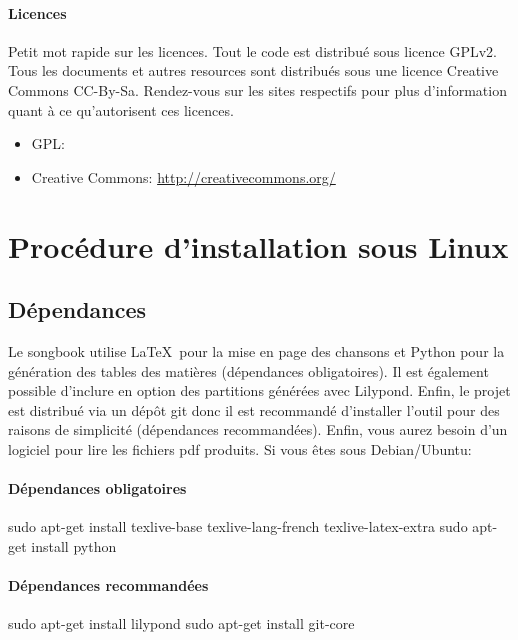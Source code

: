 \documentclass[versionenligne]{patacrep}
\begin{document}
\paragraph{Licences}
Petit mot rapide sur les licences. Tout le code est distribué sous
licence GPLv2. Tous les documents et autres resources sont distribués
sous une licence Creative Commons CC-By-Sa. Rendez-vous sur les sites
respectifs pour plus d'information quant à ce qu'autorisent ces
licences.
\begin{itemize}
\item GPL: \url{}
\item Creative Commons: \url{http://creativecommons.org/}
\end{itemize}


\section{Procédure d'installation sous Linux}

\subsection{Dépendances}
\label{sec:songbook-dep}

Le songbook utilise \LaTeX\, pour la mise en page des chansons et
Python pour la génération des tables des matières (dépendances
obligatoires).  Il est également possible d'inclure en option des
partitions générées avec Lilypond. Enfin, le projet est distribué via
un dépôt git donc il est recommandé d'installer l'outil pour des
raisons de simplicité (dépendances recommandées). Enfin, vous aurez
besoin d'un logiciel pour lire les fichiers pdf produits. Si vous êtes
sous Debian/Ubuntu:

\paragraph{Dépendances obligatoires}
\begin{unixcom}
  sudo apt-get install texlive-base texlive-lang-french texlive-latex-extra
  sudo apt-get install python
\end{unixcom}

\paragraph{Dépendances recommandées}
\begin{unixcom}
  sudo apt-get install lilypond
  sudo apt-get install git-core
\end{unixcom}
\end{document}
